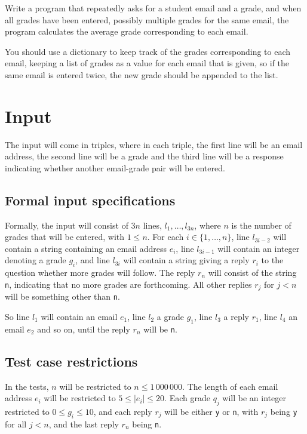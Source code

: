 
Write a program that repeatedly asks for a student email and a grade,
and when all grades have been entered,
possibly multiple grades for the same email,
the program calculates the average grade corresponding to each email.

You should use a dictionary to keep track of the grades corresponding to each email,
keeping a list of grades as a value for each email that is given,
so if the same email is entered twice, the new grade should be appended to the list.


\section*{Input}

The input will come in triples,
where in each triple,
the first line will be an email address,
the second line will be a grade
and the third line will be a response
indicating whether another email-grade pair will be entered.

\subsection*{Formal input specifications}
Formally, the input will consist of $3n$ lines,
$l_1, \dots, l_{3n}$,
where $n$ is the number of grades that will be entered, with $1 \le n$.
For each $i \in \{1, \dots, n\}$,
line $l_{3i - 2}$ will contain a string containing an email address $e_i$,
line $l_{3i - 1}$ will contain an integer denoting a grade $g_i$,
and line $l_{3i}$ will contain a string giving a reply $r_i$
to the question whether more grades will follow.
The reply $r_n$ will consist of the string \texttt{n},
indicating that no more grades are forthcoming.
All other replies $r_j$ for $j < n$
will be something other than \texttt{n}.

So line $l_1$ will contain an email $e_1$,
line $l_2$ a grade $g_1$,
line $l_3$ a reply $r_1$,
line $l_4$ an email $e_2$
and so on,
until the reply $r_n$ will be \texttt{n}.

\subsection*{Test case restrictions}
In the tests, $n$ will be restricted to
$n \le 1\,000\,000$.
The length of each email address $e_i$ will be restricted to
$5 \le |e_i| \le 20$.
Each grade $q_j$ will be an integer restricted to $0 \le g_i \le 10$,
and each reply $r_j$ will be either \texttt{y} or \texttt{n},
with $r_j$ being \texttt{y} for all $j < n$,
and the last reply $r_n$ being \texttt{n}.


